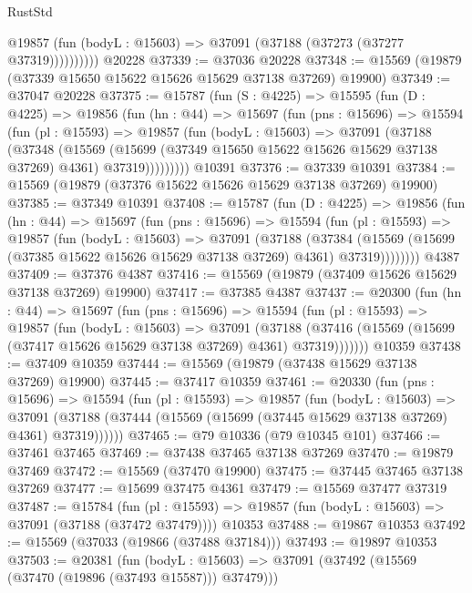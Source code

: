\begin{lexlean}{RustStd}
\begin{coremodule}
              @19857 (fun (bodyL : @15603) => @37091 (@37188 (@37273 (@37277 @37319))))))))))
    @20228
@37339 := @37036 @20228
@37348 := @15569 (@19879 (@37339 @15650 @15622 @15626 @15629 @37138 @37269) @19900)
@37349 := @37047 @20228
@37375 := @15787
    (fun (S : @4225) =>
    @15595
      (fun (D : @4225) =>
      @19856
        (fun (hn : @44) =>
        @15697
          (fun (pns : @15696) =>
          @15594
            (fun (pl : @15593) =>
            @19857
              (fun (bodyL : @15603) =>
              @37091
                (@37188
                  (@37348
                    (@15569
                      (@15699 (@37349 @15650 @15622 @15626 @15629 @37138 @37269) @4361)
                      @37319)))))))))
    @10391
@37376 := @37339 @10391
@37384 := @15569 (@19879 (@37376 @15622 @15626 @15629 @37138 @37269) @19900)
@37385 := @37349 @10391
@37408 := @15787
    (fun (D : @4225) =>
    @19856
      (fun (hn : @44) =>
      @15697
        (fun (pns : @15696) =>
        @15594
          (fun (pl : @15593) =>
          @19857
            (fun (bodyL : @15603) =>
            @37091
              (@37188
                (@37384
                  (@15569 (@15699 (@37385 @15622 @15626 @15629 @37138 @37269) @4361) @37319))))))))
    @4387
@37409 := @37376 @4387
@37416 := @15569 (@19879 (@37409 @15626 @15629 @37138 @37269) @19900)
@37417 := @37385 @4387
@37437 := @20300
    (fun (hn : @44) =>
    @15697
      (fun (pns : @15696) =>
      @15594
        (fun (pl : @15593) =>
        @19857
          (fun (bodyL : @15603) =>
          @37091
            (@37188
              (@37416 (@15569 (@15699 (@37417 @15626 @15629 @37138 @37269) @4361) @37319)))))))
    @10359
@37438 := @37409 @10359
@37444 := @15569 (@19879 (@37438 @15629 @37138 @37269) @19900)
@37445 := @37417 @10359
@37461 := @20330
    (fun (pns : @15696) =>
    @15594
      (fun (pl : @15593) =>
      @19857
        (fun (bodyL : @15603) =>
        @37091 (@37188 (@37444 (@15569 (@15699 (@37445 @15629 @37138 @37269) @4361) @37319))))))
@37465 := @79 @10336 (@79 @10345 @101)
@37466 := @37461 @37465
@37469 := @37438 @37465 @37138 @37269
@37470 := @19879 @37469
@37472 := @15569 (@37470 @19900)
@37475 := @37445 @37465 @37138 @37269
@37477 := @15699 @37475 @4361
@37479 := @15569 @37477 @37319
@37487 := @15784
    (fun (pl : @15593) => @19857 (fun (bodyL : @15603) => @37091 (@37188 (@37472 @37479))))
    @10353
@37488 := @19867 @10353
@37492 := @15569 (@37033 (@19866 (@37488 @37184)))
@37493 := @19897 @10353
@37503 := @20381
    (fun (bodyL : @15603) => @37091 (@37492 (@15569 (@37470 (@19896 (@37493 @15587))) @37479)))

\end{coremodule}
\end{lexlean}
